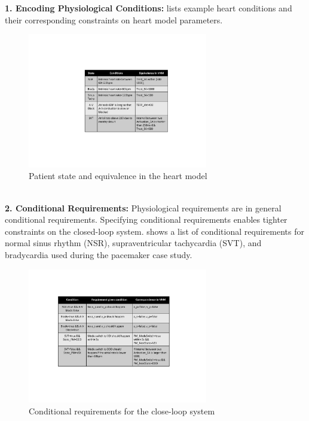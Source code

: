 \noindent
\textbf{1. Encoding Physiological Conditions:}   lists example heart conditions and their corresponding constraints on heart model parameters.
\begin{figure}[!t]
	\center
	\includegraphics[width=0.70\textwidth]{figs/state.pdf}
	\center
	\vspace{-10pt}	
	\caption{Patient state and equivalence in the heart model}
	\vspace{-10pt}	
	\label{fig:state}
\end{figure}
\noindent
\\\textbf{2. Conditional Requirements:} Physiological requirements are in general conditional requirements. Specifying conditional requirements enables tighter constraints on the closed-loop system.  shows a list of conditional requirements for normal sinus rhythm (NSR), supraventricular tachycardia (SVT), and bradycardia used during the pacemaker case study. 
\begin{figure}
	\center
	\includegraphics[width=0.7\textwidth]{figs/conditional.pdf}
	\center
	\vspace{-10pt}
	\caption{Conditional requirements for the close-loop system}
	\label{fig:conditional}
\end{figure}

